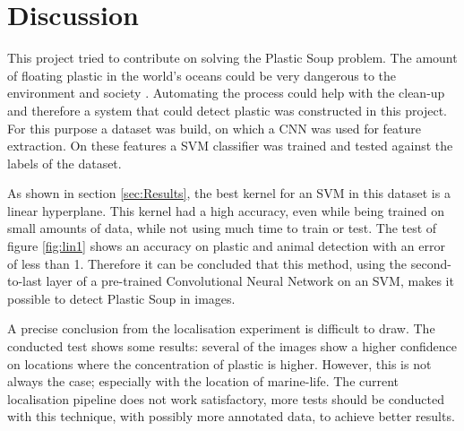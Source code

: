 \section{Discussion}
\label{sec:Discussion}
This project tried to contribute on solving the Plastic Soup problem.
The amount of floating plastic in the world's oceans could be very dangerous to the environment and society \citep{moore2011plastic}.
Automating the process could help with the clean-up and therefore a system that could detect plastic was constructed in this project.
For this purpose a dataset was build, on which a CNN was used for feature extraction.
On these features a SVM classifier was trained and tested against the labels of the dataset.

As shown in section \ref{sec:Results}, the best kernel for an SVM in this dataset is a linear hyperplane. This kernel had a high accuracy, even while being trained on small amounts of data, while not using much time to train or test.
The test of figure \ref{fig:lin1} shows an accuracy on plastic and animal detection with an error of less than 1\permil.
Therefore it can be concluded that this method, using the second-to-last layer of a pre-trained Convolutional Neural Network on an SVM, makes it possible to detect Plastic Soup in images.

A precise conclusion from the localisation experiment is difficult to draw.
The conducted test shows some results: several of the images show a higher confidence on locations where the concentration of plastic is higher.
However, this is not always the case; especially with the location of marine-life.
The current localisation pipeline does not work satisfactory, more tests should be conducted with this technique, with possibly more annotated data, to achieve better results.

